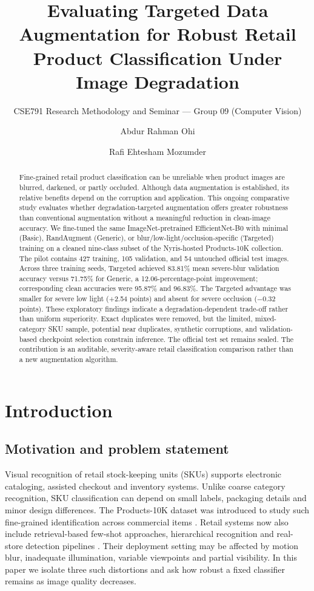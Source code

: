 \documentclass[sigconf,nonacm]{acmart}
\title{Evaluating Targeted Data Augmentation for Robust Retail Product Classification Under Image Degradation}
\subtitle{CSE791 Research Methodology and Seminar --- Group 09 (Computer Vision)}
\author{Abdur Rahman Ohi}
\affiliation{\institution{BRAC University}\department{Department of Computer Science and Engineering; Student ID: 22301280}\city{Dhaka}\country{Bangladesh}}
\author{Rafi Ehtesham Mozumder}
\affiliation{\institution{BRAC University}\department{Department of Computer Science and Engineering; Student ID: 22301489}\city{Dhaka}\country{Bangladesh}}
\begin{document}
\begin{abstract}
Fine-grained retail product classification can be unreliable when product images are blurred, darkened, or partly occluded. Although data augmentation is established, its relative benefits depend on the corruption and application. This ongoing comparative study evaluates whether degradation-targeted augmentation offers greater robustness than conventional augmentation without a meaningful reduction in clean-image accuracy. We fine-tuned the same ImageNet-pretrained EfficientNet-B0 with minimal (Basic), RandAugment (Generic), or blur/low-light/occlusion-specific (Targeted) training on a cleaned nine-class subset of the Nyris-hosted Products-10K collection. The pilot contains 427 training, 105 validation, and 54 untouched official test images. Across three training seeds, Targeted achieved 83.81\% mean severe-blur validation accuracy versus 71.75\% for Generic, a 12.06-percentage-point improvement; corresponding clean accuracies were 95.87\% and 96.83\%. The Targeted advantage was smaller for severe low light (+2.54 points) and absent for severe occlusion ($-0.32$ points). These exploratory findings indicate a degradation-dependent trade-off rather than uniform superiority. Exact duplicates were removed, but the limited, mixed-category SKU sample, potential near duplicates, synthetic corruptions, and validation-based checkpoint selection constrain inference. The official test set remains sealed. The contribution is an auditable, severity-aware retail classification comparison rather than a new augmentation algorithm.
\end{abstract}
\maketitle

\section{Introduction}
\subsection{Motivation and problem statement}
Visual recognition of retail stock-keeping units (SKUs) supports electronic cataloging, assisted checkout and inventory systems. Unlike coarse category recognition, SKU classification can depend on small labels, packaging details and minor design differences. The Products-10K dataset was introduced to study such fine-grained identification across commercial items \cite{bai2020products}. Retail systems now also include retrieval-based few-shot approaches, hierarchical recognition and real-store detection pipelines \cite{lamm2025rag,hori2026hierarchical,sah2026grocer}. Their deployment setting may be affected by motion blur, inadequate illumination, variable viewpoints and partial visibility. In this paper we isolate three such distortions and ask how robust a fixed classifier remains as image quality decreases.
\end{document}

